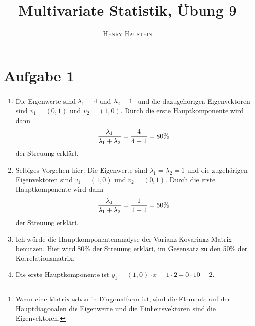 \documentclass{article}
\title{\textbf{Multivariate Statistik, Übung 9}}
\author{\textsc{Henry Haustein}}
\date{}
\begin{document}
	\maketitle
	
	\section*{Aufgabe 1}
	\begin{enumerate}[label=(\alph*)]
		\item Die Eigenwerte sind $\lambda_1=4$ und $\lambda_2=1$\footnote{Wenn eine Matrix schon in Diagonalform ist, sind die Elemente auf der Hauptdiagonalen die Eigenwerte und die Einheitsvektoren sind die Eigenvektoren.} und die dazugehörigen Eigenvektoren sind $v_1=(0,1)$ und $v_2=(1,0)$. Durch die erste Hauptkomponente wird dann
		\begin{align}
			\frac{\lambda_1}{\lambda_1 + \lambda_2} = \frac{4}{4+1} = 80\% \notag
		\end{align}
		der Streuung erklärt.
		\item Selbiges Vorgehen hier: Die Eigenwerte sind $\lambda_1=\lambda_2=1$ und die zugehörigen Eigenvektoren sind $v_1=(1,0)$ und $v_2=(0,1)$. Durch die erste Hauptkomponente wird dann
		\begin{align}
			\frac{\lambda_1}{\lambda_1 + \lambda_2} = \frac{1}{1+1} = 50\% \notag
		\end{align}
		der Streuung erklärt.
		\item Ich würde die Hauptkomponentenanalyse der Varianz-Kovarianz-Matrix benutzen. Hier wird 80\% der Streuung erklärt, im Gegensatz zu den 50\% der Korrelationsmatrix.
		\item Die erste Hauptkomponente ist $y_1 = (1,0)\cdot x = 1\cdot 2 + 0\cdot 10 = 2$.
	\end{enumerate}
\end{document}
